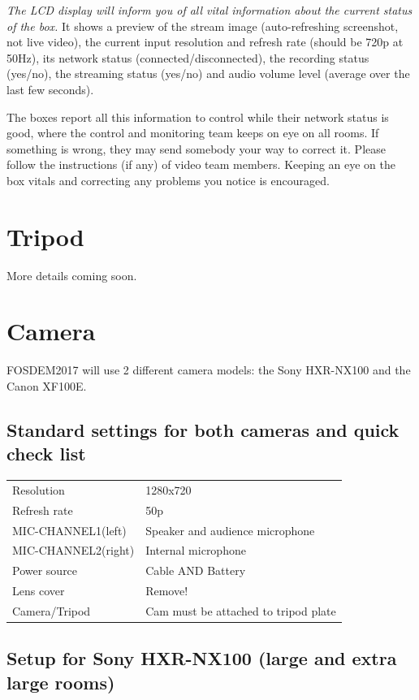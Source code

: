 \documentclass{article}
\begin{document}
\emph{The LCD display will inform you of all vital information about the current status of the box.} It shows a preview of the stream image (auto-refreshing screenshot, not live video), the current input resolution and refresh rate (should be 720p at 50Hz), its network status (connected/disconnected), the recording status (yes/no), the streaming status (yes/no) and audio volume level (average over the last few seconds).

The boxes report all this information to control while their network status is good, where the control and monitoring team keeps on eye on all rooms. If something is wrong, they may send somebody your way to correct it. Please follow the instructions (if any) of video team members. Keeping an eye on the box vitals and correcting any problems you notice is encouraged.

\section{Tripod}
More details coming soon.

\section{Camera}
FOSDEM2017 will use 2 different camera models: the Sony HXR-NX100 and the Canon XF100E.

\subsection{Standard settings for both cameras and quick check list}
\begin{tabular}{| l | l |}
Resolution & 1280x720 \\
Refresh rate & 50p \\
MIC-CHANNEL1(left) &  Speaker and audience microphone \\
MIC-CHANNEL2(right) & Internal microphone \\
Power source & Cable AND Battery \\
Lens cover & Remove! \\
Camera/Tripod & Cam must be attached to tripod plate \\
\end{tabular}

\subsection{Setup for Sony HXR-NX100 (large and extra large rooms)}
\end{document}
